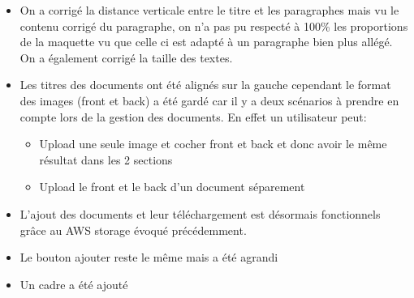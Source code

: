 \documentclass[../main.tex]{subfiles}
\begin{document}
    \begin{itemize}
        \item On a corrigé la distance verticale entre le titre et les paragraphes mais vu le contenu corrigé du paragraphe, on n'a pas pu respecté à 100\% les proportions de la maquette vu que celle ci est adapté à un paragraphe bien plus allégé. On a également corrigé la taille des textes.
        \item Les titres des documents ont été alignés sur la gauche cependant le format des images (front et back) a été gardé car il y a deux scénarios à prendre en compte lors de la gestion des documents. En effet un utilisateur peut:  
        \begin{itemize}
            \item Upload une seule image et cocher front et back et donc avoir le même résultat dans les 2 sections 
            \item Upload le front et le back d'un document séparement
        \end{itemize}
        \item L'ajout des documents et leur téléchargement est désormais fonctionnels grâce au AWS storage évoqué précédemment.
        \item Le bouton ajouter reste le même mais a été agrandi 
        \item Un cadre a été ajouté
    \end{itemize}
\end{document}
